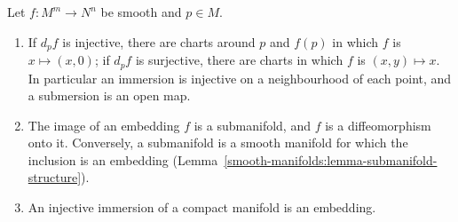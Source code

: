 \begin{proposition}\label{smooth-manifolds:proposition-local-forms}
Let $f \colon M^m \to N^n$ be smooth and $p \in M$.
\begin{enumerate}
\item If $d_pf$ is injective, there are charts around $p$ and $f(p)$ in which $f$ is $x \mapsto (x, 0)$; if $d_pf$ is surjective, there are charts in which $f$
is $(x, y) \mapsto x$. In particular an immersion is injective on a neighbourhood of each point, and a submersion is an open map.
\item The image of an embedding $f$ is a submanifold, and $f$ is a diffeomorphism onto it. Conversely, a submanifold is a smooth manifold for which the
inclusion is an embedding (Lemma~\ref{smooth-manifolds:lemma-submanifold-structure}).
\item An injective immersion of a compact manifold is an embedding.
\end{enumerate}
\end{proposition}


